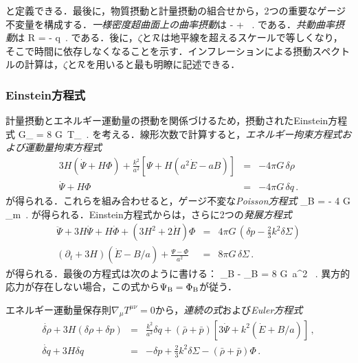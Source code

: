と定義できる．最後に，物質摂動と計量摂動の組合せから，2つの重要なゲージ不変量を構成する．\textit{一様密度超曲面上の曲率摂動}は
\beq
- \zeta \equiv \Psi +  \delta \rho\, . 
\eeq
である．\textit{共動曲率摂動}は
\beq
{\cal R} = \Psi -  \delta q\, .
\eeq
である．後に，$\zeta$と${\cal R}$は地平線を超えるスケールで等しくなり，そこで時間に依存しなくなることを示す．インフレーションによる摂動スペクトルの計算は，$\zeta$と${\cal R}$を用いると最も明瞭に記述できる．



\subsubsection{Einstein方程式}



計量摂動とエネルギー運動量の摂動を関係づけるため，摂動されたEinstein方程式
\beq
\delta G_{\mu \nu} = 8 \pi G\, \delta T_{\mu \nu}\, .
\eeq
を考える．線形次数で計算すると，\textit{エネルギー拘束方程式および運動量拘束方程式}
\begin{eqnarray}
3H(\dot \Psi + H \Phi) + \frac{k^2}{a^2} \left[ \Psi + H(a^2 \dot E- aB)\right] &=& - 4\pi G \, \delta \rho \\
\dot \Psi + H \Phi &=& - 4\pi G \, \delta q \, .
\end{eqnarray}
が得られる．これらを組み合わせると，ゲージ不変な\textit{Poisson方程式}
\beq
{} \Psi_{\rm B} = - 4 \pi G \delta \rho_m\, .
\eeq
が得られる．Einstein方程式からは，さらに2つの\textit{発展方程式}
\begin{eqnarray}
\ddot \Psi + 3 H \dot \Psi + H \dot \Phi + (3 H^2 + 2 \dot H) \Phi &=& 4 \pi G\, \left( \delta p - \frac{2}{3} k^2 \delta \Sigma \right) \\
(\partial_t + 3 H) (\dot E - B/a) + \frac{\Psi - \Phi}{a^2}&=& 8 \pi G\, \delta \Sigma\, .
\end{eqnarray}
が得られる．最後の方程式は次のように書ける：
\beq
\Psi_{\rm B} - \Phi_{\rm B} = 8 \pi G\, a^2 \delta \Sigma\, .
\eeq
異方的応力が存在しない場合，この式から$\Psi_{\rm B} = \Phi_{\rm B}$が従う．



エネルギー運動量保存則$\nabla_\mu T^{\mu \nu} = 0$から，\textit{連続の式}および\textit{Euler方程式}
\begin{eqnarray}
\label{equ:conX}
\dot{\delta \rho} + 3 H (\delta \rho + \delta p) &=& \frac{k^2}{a^2} \delta q + (\bar \rho + \bar p) [3 \dot \Psi + k^2 (\dot E + B/a)] \, ,\\
\dot{\delta q} + 3 H \delta q &=& - \delta p + \frac{2}{3} k^2 \delta \Sigma - (\bar \rho + \bar p) \Phi\, .
\end{eqnarray}


